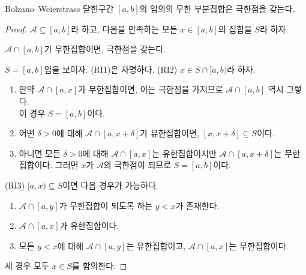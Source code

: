 \documentclass[serif]{beamer}
\begin{document}
\begin{frame}{}
    \begin{thm*}{Bolzano--Weierstrass}
        닫힌구간 $[a,b]$의 임의의 무한 부분집합은 극한점을 갖는다.
    \end{thm*}
    \begin{proof}
        $\mathcal{A}\subseteq[a,b]$라 하고, 다음을 만족하는 모든 $x\in[a,b]$의 집합을 $S$라 하자.
        \begin{center}
            $\mathcal{A}\cap[a,b]$가 무한집합이면, 극한점을 갖는다.
        \end{center}
        $S=[a,b]$임을 보이자. (RI1)은 자명하다. (RI2) $x\in S\cap[a,b)$라 하자.
        \begin{enumerate}[1.]
            \item 만약 $\mathcal{A}\cap[a,x]$가 무한집합이면, 이는 극한점을 가지므로 $\mathcal{A}\cap[a,b]$ 역시 그렇다. \\
                이 경우 $S=[a,b]$이다.
            \item 어떤 $\delta>0$에 대해 $\mathcal{A}\cap[a,x+\delta]$가 유한집합이면, $[x,x+\delta]\subseteq S$이다.
            \item 아니면 모든 $\delta>0$에 대해 $\mathcal{A}\cap[a,x]$는 유한집합이지만 $\mathcal{A}\cap[a,x+\delta]$는 무한집합이다. 
                그러면 $x$가 $\mathcal A$의 극한점이 되므로 $S=[a,b]$이다.
        \end{enumerate}
        (RI3) $[a,x)\subseteq S$이면 다음 경우가 가능하다.
        \begin{enumerate}[1.]
            \item $\mathcal{A}\cap[a,y]$가 무한집합이 되도록 하는 $y<x$가 존재한다.
            \item $\mathcal{A}\cap[a,x]$가 유한집합이다.
            \item 모든 $y<x$에 대해 $\mathcal{A}\cap[a,y]$는 유한집합이고, $\mathcal{A}\cap[a,x]$는 무한집합이다.
        \end{enumerate}
        세 경우 모두 $x\in S$를 함의한다.
    \end{proof}
\end{frame}
\end{document}
